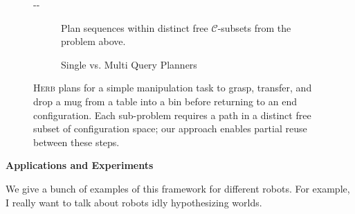\documentclass{report}
\newlength{\offsetpage}
\newenvironment{widepage}
   {\begin{adjustwidth}{-\offsetpage}{-\offsetpage}%
    \addtolength{\textwidth}{2\offsetpage}}%
{\end{adjustwidth}}
\begin{document}
{\begin{figure}
\begin{widepage}
\begin{center}
\begin{subfigure}[b]{4.0in}
\begin{center}
\begin{tikzpicture}
\end{tikzpicture}
      \end{center}
      \caption{Plan sequences
         within distinct free $\mathcal{C}$-subsets
         from the problem above.}
   \end{subfigure}%
   \quad%
   \begin{subfigure}[b]{2.0in}
      \begin{center}
      \end{center}
      \caption{Single vs. Multi Query Planners}
   \end{subfigure}
   \caption{\textsc{Herb} plans for a simple manipulation task
      to grasp, transfer, and drop a mug from a table into a bin
      before returning to an end configuration.
      Each sub-problem requires a path in a distinct free subset of
      configuration space;
      our approach enables partial reuse between these steps.}
   \label{fig:intro-multi-step}
\end{center}
\end{widepage}
\end{figure}
}

\textbf{Applications and Experiments}

We give a bunch of examples of this framework
for different robots.
For example, I really want to talk about robots idly
hypothesizing worlds.
\end{document}
